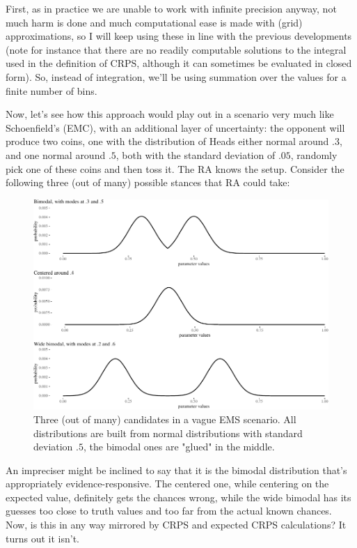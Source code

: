 \documentclass[
  10pt,
  dvipsnames,enabledeprecatedfontcommands]{scrartcl}
\begin{document}
First, as in practice we are unable to work with infinite precision
anyway, not much harm is done and much computational ease is made with
(grid) approximations, so I will keep using these in line with the
previous developments (note for instance that there are no readily
computable solutions to the integral used in the definition of CRPS,
although it can sometimes be evaluated in closed form). So, instead of
integration, we'll be using summation over the values for a finite
number of bins.

Now, let's see how this approach would play out in a scenario very much
like Schoenfield's (EMC), with an additional layer of uncertainty: the
opponent will produce two coins, one with the distribution of Heads
either normal around \(.3\), and one normal around \(.5\), both with the
standard deviation of \(.05\), randomly pick one of these coins and then
toss it. The RA knows the setup. Consider the following three (out of
many) possible stances that RA could take:

\begin{figure}[H]

\begin{center}\includegraphics[width=1\linewidth]{impreciseEpistemicFINAL_files/figure-latex/figEMC-1} \end{center}
\caption{Three (out of many) candidates in a vague EMS scenario. All distributions are built from normal  distributions with standard deviation $.5$, the bimodal ones are "glued" in the middle.}
\label{fig:EMC}
\end{figure}

An impreciser might be inclined to say that it is the bimodal
distribution that's appropriately evidence-responsive. The centered one,
while centering on the expected value, definitely gets the chances
wrong, while the wide bimodal has its guesses too close to truth values
and too far from the actual known chances. Now, is this in any way
mirrored by CRPS and expected CRPS calculations? It turns out it isn't.
\end{document}
